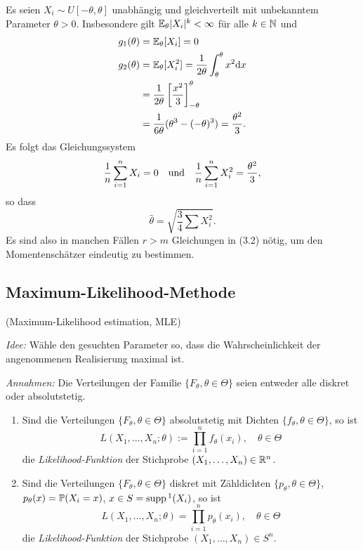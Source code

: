\begin{exmp}
  Es seien $X_i \sim U[-\theta, \theta]$ unabhängig und gleichverteilt mit
  unbekanntem Parameter $\theta > 0$. Insbesondere gilt $\mathbb{E}_\theta |X_i|^k <
  \infty$ für alle $k \in \mathbb{N}$ und
  \begin{align*}
    g_1( \theta ) &= \mathbb{E}_\theta[X_i] = 0 \\
    g_2( \theta ) &= \mathbb{E}_\theta[X_i^2]
                    = \frac{1}{2 \theta} \int_{\theta}^\theta x^2 \mathrm{d} x \\
                  &= \frac{1}{2 \theta} \left[ \frac{x^2}{3} \right]_{-\theta}^\theta \\
                  &= \frac{1}{6 \theta} (\theta^3 - (-\theta)^3) = \frac{\theta^2}{3}.
  \end{align*}
  Es folgt das Gleichungssystem
  \[ \frac{1}{n} \sum_{i=1}^n X_i = 0 \quad \text{und} \quad
    \frac{1}{n} \sum_{i=1}^n X_i^2 = \frac{\theta^2}{3}, \]
  so dass
  \[ \hat{\theta} = \sqrt{\frac{3}{4} \sum X_i^2}. \]
  Es sind also in manchen Fällen $r > m$ Gleichungen in (3.2) nötig, um den
  Momentenschätzer eindeutig zu bestimmen.
\end{exmp}

\subsection{Maximum-Likelihood-Methode}
(Maximum-Likelihood estimation, MLE)

\emph{Idee:} Wähle den gesuchten Parameter so, dass die Wahrscheinlichkeit der
angenommenen Realisierung maximal ist.

\emph{Annahmen:} Die Verteilungen der Familie $\{F_\theta, \theta \in \Theta \}$
seien entweder alle diskret oder absolutstetig.

\begin{defn} %
  \renewcommand{\thefootnote}{\fnsymbol{footnote}}
  \begin{enumerate}
  \item Sind die Verteilungen $\{F_\theta, \theta \in \Theta \}$ absolutstetig
    mit Dichten $\{ f_\theta, \theta \in \Theta \}$, so ist
    \[ L( X_1, \ldots, X_n; \theta) := \prod_{i=1}^n f_\theta(x_i), \quad
      \theta \in \Theta \]
    die \emph{Likelihood-Funktion} der Stichprobe $(X_1, \ldots, X_n) \in
    \mathbb{R}^n$.
  \item Sind die Verteilungen $\{ F_\theta, \theta \in \Theta \}$ diskret mit
    Zähldichten $\{ p_\theta, \theta \in \Theta \}$, $p_\theta(x) = \mathbb{P}(X_i =
    x)$, $x \in S = \operatorname{supp}\footnotemark (X_i)$, so ist
    \[ L( X_1, \ldots, X_n; \theta) = \prod_{i=1}^n p_\theta(x_i), \quad \theta
      \in \Theta \]
    die \emph{Likelihood-Funktion} der Stichprobe $(X_1, \ldots, X_n) \in S^n$.
  \end{enumerate}
  \renewcommand{\thefootnote}{\arabic{footnote}}
\end{defn}

